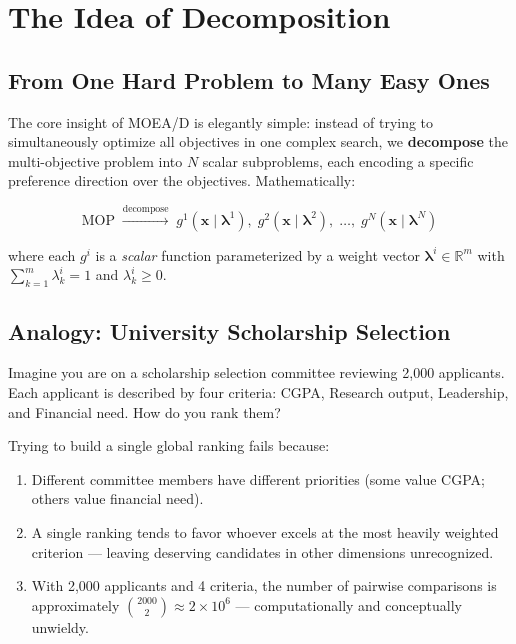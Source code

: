 \documentclass[12pt,a4paper]{article}
\begin{document}
\section{The Idea of Decomposition}
\label{sec:decomp}

\subsection{From One Hard Problem to Many Easy Ones}

The core insight of MOEA/D is elegantly simple: instead of trying to simultaneously optimize all objectives in one complex search, we \textbf{decompose} the multi-objective problem into $N$ scalar subproblems, each encoding a specific preference direction over the objectives. Mathematically:

\begin{equation}
    \text{MOP} \;\xrightarrow{\text{decompose}}\; g^1(\mathbf{x}\mid\boldsymbol{\lambda}^1),\;
    g^2(\mathbf{x}\mid\boldsymbol{\lambda}^2),\; \ldots,\;
    g^N(\mathbf{x}\mid\boldsymbol{\lambda}^N)
\end{equation}

where each $g^i$ is a \emph{scalar} function parameterized by a weight vector $\boldsymbol{\lambda}^i \in \mathbb{R}^m$ with $\sum_{k=1}^m \lambda^i_k = 1$ and $\lambda^i_k \geq 0$.

\subsection{Analogy: University Scholarship Selection}

Imagine you are on a scholarship selection committee reviewing 2,000 applicants. Each applicant is described by four criteria: CGPA, Research output, Leadership, and Financial need. How do you rank them?

Trying to build a single global ranking fails because:
\begin{enumerate}[leftmargin=1.5cm]
    \item Different committee members have different priorities (some value CGPA; others value financial need).
    \item A single ranking tends to favor whoever excels at the most heavily weighted criterion --- leaving deserving candidates in other dimensions unrecognized.
    \item With 2,000 applicants and 4 criteria, the number of pairwise comparisons is approximately $\binom{2000}{2} \approx 2 \times 10^6$ --- computationally and conceptually unwieldy.
\end{enumerate}
\end{document}
